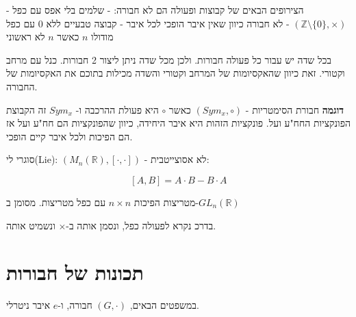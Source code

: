 \documentclass{tstextbook}
\begin{document}
\begin{example}
הצירופים הבאים של קבוצות ופעולה הם לא חבורה:
- שלמים בלי אפס עם כפל - \((\mathbb{Z}\setminus \{ 0 \},\times)\) - לא חבורה כיוון שאין איבר הופכי לכל איבר
- קבוצה טבעיים ללא 0 עם כפל מודולו \(n\) כאשר \(n\) לא ראשוני

\end{example}
\begin{remark}
בכל שדה יש עבור כל פעולה חבורות. ולכן מכל שדה ניתן ליצור 2 חבורות. כנל עם מרחב וקטורי. זאת כיוון שהאקסיומות של המרחב וקטורי והשדה מכילות בתוכם את האקסיומות של החבורה.

\end{remark}
\textbf{דוגמה}
חבורת הסימטריות - \((Sym_{x},\circ)\) כאשר \(\circ\) היא פעולת ההרכבה ו- \(Sym_{x}\) זה הקבוצת הפונקציות החח"ע ועל. פונקציות הזהות היא איבר היחידה, כיוון שהפונקציות הם חח"ע ועל אז הם הפיכות ולכל איבר קיים הופכי.

\begin{example}
סוגרי לי(Lie): \((M_{n}(\mathbb{R}),[\cdot,\cdot])\) - לא אסוצייטבית:

$$[A,B]=A\cdot B-B\cdot A$$

\end{example}
\begin{example}
מטריצות הפיכות \(n\times n\) עם כפל מטריצות. מסומן ב-\(GL_{n}(\mathbb{R})\)

\end{example}
\begin{remark}
בדרכ נקרא לפעולה כפל, ונסמן אותה ב-\(\times\) ונשמיט אותה. 

\end{remark}
\section{תכונות של חבורות}

במשפטים הבאים, \((G,\cdot)\) חבורה, ו-\(e\) איבר ניטרלי.
\end{document}
